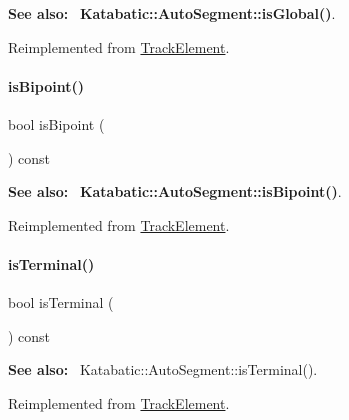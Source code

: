 {\bfseries See also\+:}~ \textbf{ Katabatic\+::\+Auto\+Segment\+::is\+Global()}. 

Reimplemented from \mbox{\hyperlink{classKite_1_1TrackElement_a19ba379112d6b29faa45c5eefbf38500}{Track\+Element}}.

\mbox{\label{classKite_1_1TrackSegment_a72741158d19af38e84c5e9c08f91270f}} 
\paragraph{\texorpdfstring{is\+Bipoint()}{isBipoint()}}
{\footnotesize\ttfamily bool is\+Bipoint (\begin{DoxyParamCaption}{ }\end{DoxyParamCaption}) const\hspace{0.3cm}{\ttfamily [virtual]}}

{\bfseries See also\+:}~ \textbf{ Katabatic\+::\+Auto\+Segment\+::is\+Bipoint()}. 

Reimplemented from \mbox{\hyperlink{classKite_1_1TrackElement_a72741158d19af38e84c5e9c08f91270f}{Track\+Element}}.

\mbox{\label{classKite_1_1TrackSegment_a1e074cb3064037035548e5e6d238e315}} 
\paragraph{\texorpdfstring{is\+Terminal()}{isTerminal()}}
{\footnotesize\ttfamily bool is\+Terminal (\begin{DoxyParamCaption}{ }\end{DoxyParamCaption}) const\hspace{0.3cm}{\ttfamily [virtual]}}

{\bfseries See also\+:}~ Katabatic\+::\+Auto\+Segment\+::is\+Terminal(). 

Reimplemented from \mbox{\hyperlink{classKite_1_1TrackElement_a1e074cb3064037035548e5e6d238e315}{Track\+Element}}.

\mbox{\label{classKite_1_1TrackSegment_a62d61c231cf404a814ae37665fa8164f}} 
